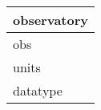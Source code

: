 \documentclass{article}
\begin{document}

\begin{tabular}{|l|} \hline
\textbf{observatory} \\ \hline
obs \\ \hline
units \\ \hline
datatype \\ \hline
\end{tabular}
\end{document}
